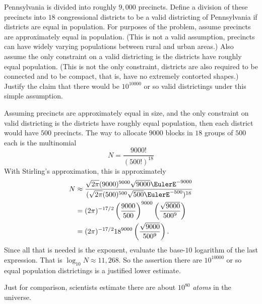 \documentclass[12pt]{article}
\begin{document}
\begin{exercise}
    Pennsylvania is divided into roughly \( 9{,}000 \) precincts.
    Define a division of these precincts into \( 18 \) congressional districts
    to be a valid districting of Pennsylvania if districts are equal in
    population.  For purposes of the problem, assume precincts
    are approximately equal in population.  (This is not a valid assumption,
    precincts can have widely varying populations between
    rural and urban areas.) Also assume the only constraint on a valid
    districting is the districts have roughly equal population.  (This
    is not the only constraint, districts are also required to be
    connected and to be compact, that is, have no extremely contorted
    shapes.) Justify the claim that there would be \( 10^{10000} \) or
    so valid districtings under this simple assumption.
\end{exercise}

\begin{solution}
    Assuming precincts are approximately equal in size, and the only
    constraint on valid districting is the districts have roughly equal
    population, then each district would have \( 500 \) precincts.  The way
    to allocate \( 9000 \) blocks in \( 18 \) groups of \( 500 \) each
    is the multinomial
    \[
        N = \frac{9000!}{(500!)^{18}}
    \] With Stirling's approximation, this is approximately
    \begin{align*}
        N       &\approx \frac{\sqrt{2\pi} (9000)^{9000} \sqrt{9000}
        \EulerE^{-9000}} {(\sqrt{2\pi} (500)^{500} \sqrt{500} \EulerE^{-500})^
        {18}} \\
        &= (2\pi)^{-17/2} \left( \frac{9000}{500} \right)^{9000} \left(
        \frac{\sqrt{9000}}{500^{9}} \right) \\
        &= (2\pi)^{-17/2} 18^{9000} \left( \frac{\sqrt{9000}}{500^{9}}
        \right).  \\
    \end{align*}
    Since all that is needed is the exponent, evaluate the base-\( 10 \)
    logarithm of the last expression.  That is \( \log_{10} N \approx 11
    {,}268 \).  So the assertion there are \( 10^{10000} \) or so equal
    population districtings is a justified lower estimate.

    Just for comparison, scientists estimate there are about \( 10^{80} \)
    \emph{atoms} in the universe.
\end{solution}
\end{document}
